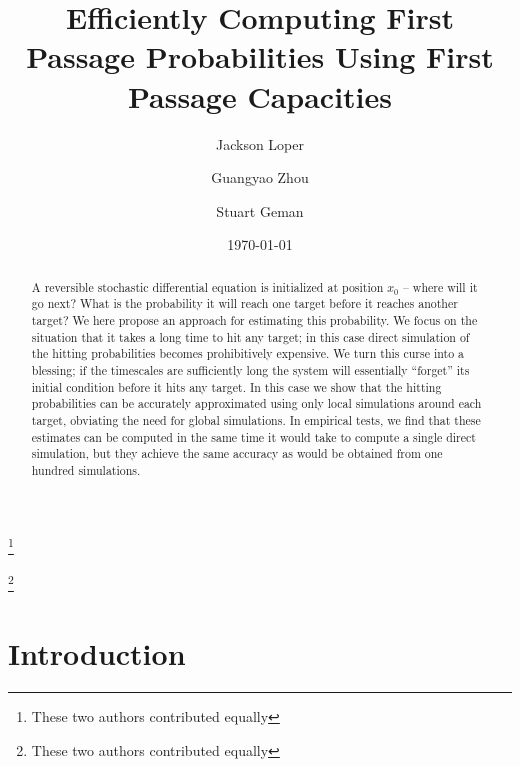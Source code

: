 \documentclass[12pt, nofootinbib,english, amsmath, amssymb, aps, priprint, graphicx,floatfix,draft]{revtex4-1}
\theoremstyle{plain}
\theoremstyle{definition}
\theoremstyle{plain}
\begin{document}
\title{Efficiently Computing First Passage Probabilities Using First Passage Capacities} %

\author{Jackson Loper}
\thanks{These two authors contributed equally}

\author{Guangyao Zhou}
\thanks{These two authors contributed equally}

\author{Stuart Geman}

\date{\today}

\begin{abstract}
	A reversible stochastic differential equation is initialized at position $x_0$ -- where will it go next?  What is the probability it will reach one target before it reaches another target?  We here propose an approach for estimating this probability.  We focus on the situation that it takes a long time to hit any target; in this case direct simulation of the hitting probabilities becomes prohibitively expensive.  We turn this curse into a blessing; if the timescales are sufficiently long the system will essentially ``forget'' its initial condition before it hits any target.  In this case we show that the hitting probabilities can be accurately approximated using only local simulations around each target, obviating the need for global simulations.  In empirical tests, we find that these estimates can be computed in the same time it would take to compute a single direct simulation, but they achieve the same accuracy as would be obtained from one hundred simulations.
\end{abstract}

\pacs{}%

\maketitle %

\section{Introduction}
\label{sec:Introduction}
\end{document}
